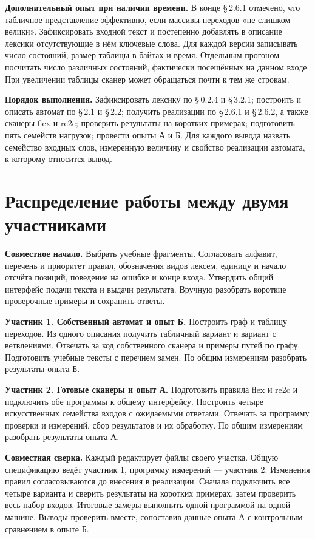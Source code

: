 \documentclass[12pt,a4paper]{article}
\newcommand{\parag}[1]{\S\,#1}
\newcommand{\task}[1]{\par\medskip\noindent\textbf{#1}\quad}
\begin{document}
\task{Дополнительный опыт при наличии времени.} В конце \parag{2.6.1} отмечено, что табличное представление эффективно, если массивы переходов «не слишком велики». Зафиксировать входной текст и постепенно добавлять в описание лексики отсутствующие в нём ключевые слова. Для каждой версии записывать число состояний, размер таблицы в байтах и время. Отдельным прогоном посчитать число различных состояний, фактически посещённых на данном входе. При увеличении таблицы сканер может обращаться почти к тем же строкам.

\task{Порядок выполнения.} Зафиксировать лексику по \parag{0.2.4} и \parag{3.2.1}; построить и описать автомат по \parag{2.1} и \parag{2.2}; получить реализации по \parag{2.6.1} и \parag{2.6.2}, а также сканеры flex и re2c; проверить результаты на коротких примерах; подготовить пять семейств нагрузок; провести опыты А и Б. Для каждого вывода назвать семейство входных слов, измеренную величину и свойство реализации автомата, к которому относится вывод.

\section*{Распределение работы между двумя участниками}

\task{Совместное начало.} Выбрать учебные фрагменты. Согласовать алфавит, перечень и приоритет правил, обозначения видов лексем, единицу и начало отсчёта позиций, поведение на ошибке и конце входа. Утвердить общий интерфейс подачи текста и выдачи результата. Вручную разобрать короткие проверочные примеры и сохранить ответы.

\task{Участник 1. Собственный автомат и опыт Б.} Построить граф и таблицу переходов. Из одного описания получить табличный вариант и вариант с ветвлениями. Отвечать за код собственного сканера и примеры путей по графу. Подготовить учебные тексты с перечнем замен. По общим измерениям разобрать результаты опыта Б.

\task{Участник 2. Готовые сканеры и опыт А.} Подготовить правила flex и re2c и подключить обе программы к общему интерфейсу. Построить четыре искусственных семейства входов с ожидаемыми ответами. Отвечать за программу проверки и измерений, сбор результатов и их обработку. По общим измерениям разобрать результаты опыта А.

\task{Совместная сверка.} Каждый редактирует файлы своего участка. Общую спецификацию ведёт участник 1, программу измерений --- участник 2. Изменения правил согласовываются до внесения в реализации. Сначала подключить все четыре варианта и сверить результаты на коротких примерах, затем проверить весь набор входов. Итоговые замеры выполнить одной программой на одной машине. Выводы проверить вместе, сопоставив данные опыта А с контрольным сравнением в опыте Б.
\end{document}
